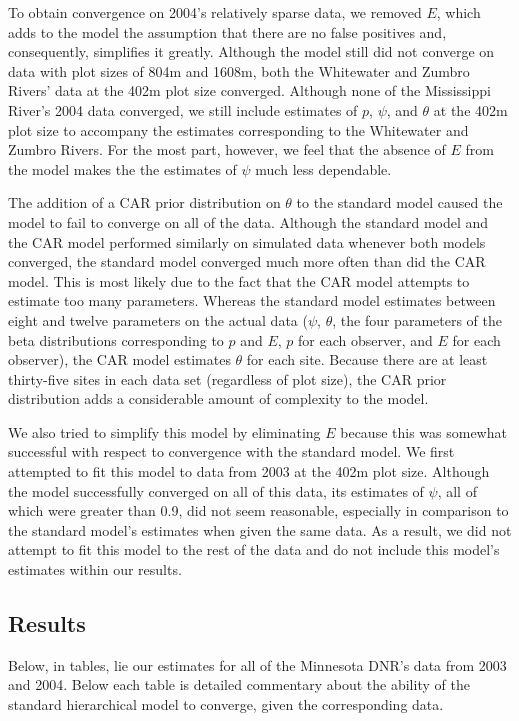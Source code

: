 \documentclass[12pt]{article}
\begin{document}
    To obtain convergence on 2004's relatively sparse data, we removed \(E\),
    which adds to the model the assumption that there are no false positives
    and, consequently, simplifies it greatly. Although the model still did not
    converge on data with plot sizes of 804m and 1608m, both the Whitewater and
    Zumbro Rivers' data at the 402m plot size converged. Although none of the
    Mississippi River's 2004 data converged, we still include estimates of
    \(p\), \(\psi\), and \(\theta\) at the 402m plot size to accompany the
    estimates corresponding to the Whitewater and Zumbro Rivers. For the most
    part, however, we feel that the absence of \(E\) from the model makes the
    the estimates of \(\psi\) much less dependable.

    The addition of a CAR prior distribution on \(\theta\) to the standard model
    caused the model to fail to converge on all of the data. Although the
    standard model and the CAR model performed similarly on simulated data
    whenever both models converged, the standard model converged much more often
    than did the CAR model. This is most likely due to the fact that the CAR
    model attempts to estimate too many parameters. Whereas the standard model
    estimates between eight and twelve parameters on the actual data (\(\psi\),
    \(\theta\), the four parameters of the beta distributions corresponding to
    \(p\) and \(E\), \(p\) for each observer, and \(E\) for each observer), the
    CAR model estimates \(\theta\) for each site. Because there are at least
    thirty-five sites in each data set (regardless of plot size), the CAR prior
    distribution adds a considerable amount of complexity to the model.

    We also tried to simplify this model by eliminating \(E\) because this was
    somewhat successful with respect to convergence with the standard model. We
    first attempted to fit this model to data from 2003 at the 402m plot size.
    Although the model successfully converged on all of this data, its estimates
    of \(\psi\), all of which were greater than 0.9, did not seem reasonable,
    especially in comparison to the standard model's estimates when given the
    same data. As a result, we did not attempt to fit this model to the rest of
    the data and do not include this model's estimates within our results.

    \subsection{Results}
    Below, in tables, lie our estimates for all of the Minnesota DNR's data from
    2003 and 2004. Below each table is detailed commentary about the ability of
    the standard hierarchical model to converge, given the corresponding data.
\end{document}
